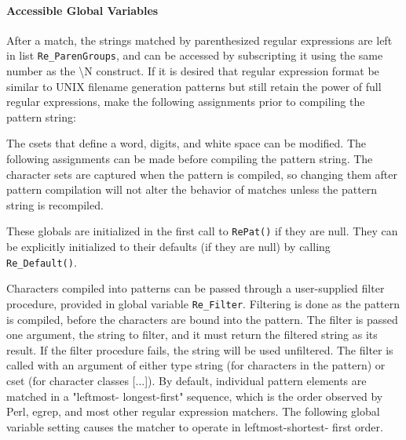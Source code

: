 \paragraph{Accessible Global Variables}
After a match, the strings matched by parenthesized regular expressions
are left in list \texttt{Re\_ParenGroups}, and can be accessed by
subscripting it using the same number as the {\textbackslash}N
construct. If it is desired that regular expression format be similar
to UNIX filename generation patterns but still retain the power of full
regular expressions, make the following assignments prior to compiling
the pattern string:


The csets that define a word, digits, and white
space can be modified. The following assignments can be made before
compiling the pattern string. The character sets are captured when the
pattern is compiled, so changing them after pattern compilation will
not alter the behavior of matches unless the pattern string is
recompiled.


These globals are initialized in the first call to \texttt{RePat()} if
they are null. They can be explicitly initialized to their defaults (if
they are null) by calling \texttt{Re\_Default()}.

Characters compiled into patterns can be passed through a user-supplied
filter procedure, provided in global variable \texttt{Re\_Filter}.
Filtering is done as the pattern is compiled, before the characters are
bound into the pattern. The filter is passed one argument, the string
to filter, and it must return the filtered string as its result. If the
filter procedure fails, the string will be used unfiltered. The filter
is called with an argument of either type string (for characters in the
pattern) or cset (for character classes [...]). By default, individual
pattern elements are matched in a "leftmost-
longest-first" sequence, which is the order observed by
Perl, egrep, and most other regular expression
matchers. The following global variable setting causes the matcher to
operate in leftmost-shortest- first order.

